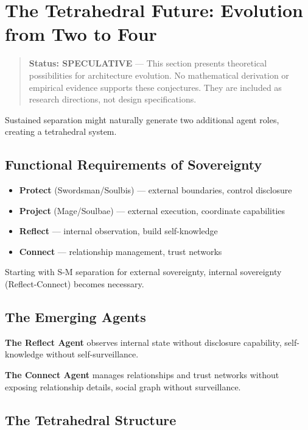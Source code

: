 \documentclass[
]{article}
\begin{document}
\section{The Tetrahedral Future: Evolution from Two to
Four}\label{the-tetrahedral-future-evolution-from-two-to-four}

\begin{quote}
\textbf{Status: SPECULATIVE} --- This section presents theoretical
possibilities for architecture evolution. No mathematical derivation or
empirical evidence supports these conjectures. They are included as
research directions, not design specifications.
\end{quote}

Sustained separation might naturally generate two additional agent
roles, creating a tetrahedral system.

\subsection{Functional Requirements of
Sovereignty}\label{functional-requirements-of-sovereignty}

\begin{itemize}
\item
  \textbf{Protect} (Swordsman/Soulbis) --- external boundaries, control
  disclosure
\item
  \textbf{Project} (Mage/Soulbae) --- external execution, coordinate
  capabilities
\item
  \textbf{Reflect} --- internal observation, build self-knowledge
\item
  \textbf{Connect} --- relationship management, trust networks
\end{itemize}

Starting with S-M separation for external sovereignty, internal
sovereignty (Reflect-Connect) becomes necessary.

\subsection{The Emerging Agents}\label{the-emerging-agents}

\textbf{The Reflect Agent} observes internal state without disclosure
capability, self-knowledge without self-surveillance.

\textbf{The Connect Agent} manages relationships and trust networks
without exposing relationship details, social graph without
surveillance.

\subsection{The Tetrahedral Structure}\label{the-tetrahedral-structure}
\end{document}
